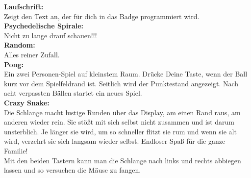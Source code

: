 \documentclass{article}
\begin{document}
\textbf{Laufschrift:}\\
Zeigt den Text an, der für dich in das Badge programmiert wird.\\

\textbf{Psychedelische Spirale:}\\
Nicht zu lange drauf schauen!!!\\

\textbf{Random:}\\
Alles reiner Zufall.\\

\textbf{Pong:}\\
Ein zwei Personen-Spiel auf kleinstem Raum. Drücke Deine Taste, wenn der Ball kurz vor dem Spielfeldrand ist. Seitlich wird der Punktestand angezeigt. Nach acht verpassten Bällen startet ein neues Spiel.\\

\textbf{Crazy Snake:}\\
Die Schlange macht lustige Runden über das Display, am einen Rand raus, am anderen wieder rein. Sie stößt mit sich selbst nicht zusammen und ist darum unsterblich. Je länger sie wird, um so schneller flitzt sie rum und wenn sie alt wird, verzehrt sie sich langsam wieder selbst. Endloser Spaß für die ganze Familie!\\

Mit den beiden Tastern kann man die Schlange nach links und rechts abbiegen lassen und so versuchen die Mäuse zu fangen.



\end{document}
